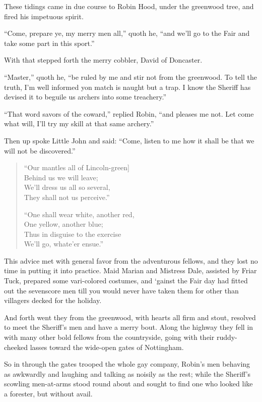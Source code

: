 These tidings came in due course to Robin Hood, under the greenwood
tree, and fired his impetuous spirit.

``Come, prepare ye, my merry men all,'' quoth he, ``and we'll go to the
Fair and take some part in this sport.''

With that stepped forth the merry cobbler, David of Doncaster.

``Master,'' quoth he, ``be ruled by me and stir not from the greenwood.
To tell the truth, I'm well informed yon match is naught but a trap. I
know the Sheriff has devised it to beguile us archers into some
treachery.''

``That word savors of the coward,'' replied Robin, ``and pleases me not.
Let come what will, I'll try my skill at that same archery.''

Then up spoke Little John and said: ``Come, listen to me how it shall be
that we will not be discovered.''

\begin{quote}
“Our mantles all of Lincoln-green]\\
Behind us we will leave;\\
We’ll dress us all so several,\\
They shall not us perceive.”

“One shall wear white, another red,\\
One yellow, another blue;\\
Thus in disguise to the exercise\\
We’ll go, whate’er ensue.”
\end{quote}

This advice met with general favor from the adventurous fellows, and
they lost no time in putting it into practice. Maid Marian and Mistress
Dale, assisted by Friar Tuck, prepared some vari-colored costumes, and
`gainst the Fair day had fitted out the sevenscore men till you would
never have taken them for other than villagers decked for the holiday.

And forth went they from the greenwood, with hearts all firm and stout,
resolved to meet the Sheriff's men and have a merry bout. Along the
highway they fell in with many other bold fellows from the countryside,
going with their ruddy-cheeked lasses toward the wide-open gates of
Nottingham.

So in through the gates trooped the whole gay company, Robin's men
behaving as awkwardly and laughing and talking as noisily as the rest;
while the Sheriff's scowling men-at-arms stood round about and sought to
find one who looked like a forester, but without avail.

